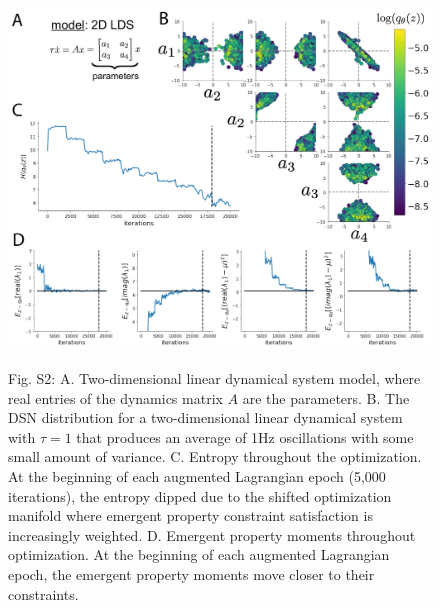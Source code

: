 \documentclass[11pt]{article}
\begin{document}
\begin{figure}
\begin{center}
\includegraphics[scale=0.5]{figures/figS2/figS2.pdf}
\end{center}
\begin{flushleft}
Fig. S2: A. Two-dimensional linear dynamical system model, where real entries of the dynamics matrix $A$ are the parameters.  B. The DSN distribution for a two-dimensional linear dynamical system  with $\tau=1$ that produces an average of 1Hz oscillations with some small amount of variance.  C. Entropy throughout the optimization.  At the beginning of each augmented Lagrangian epoch (5,000 iterations), the entropy dipped due to the shifted optimization manifold where emergent property constraint satisfaction is increasingly weighted.  D. Emergent property moments throughout optimization.  At the beginning of each augmented Lagrangian epoch, the emergent property moments move closer to their constraints.
\end{flushleft}
\end{figure}
\end{document}
